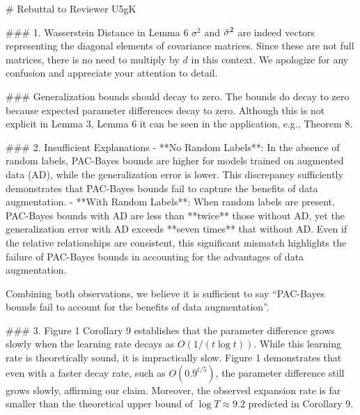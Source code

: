 \documentclass{article}
\begin{document}
\begin{markdown}
# Rebuttal to Reviewer U5gK

### 1. Wasserstein Distance in Lemma 6
$\sigma^2$ and $\Bar{\sigma}^2$ are indeed vectors representing the diagonal elements of covariance matrices. Since these are not full matrices, there is no need to multiply by $d$ in this context. We apologize for any confusion and appreciate your attention to detail.

### Generalization bounds should decay to zero.
The bounds do decay to zero because expected parameter differences decay to zero. Although this is not explicit in Lemma 3, Lemma 6 it can be seen in the application, e.g., Theorem 8.


### 2. Insufficient Explanations
- **No Random Labels**:  
  In the absence of random labels, PAC-Bayes bounds are higher for models trained on augmented data (AD), while the generalization error is lower. This discrepancy sufficiently demonstrates that PAC-Bayes bounds fail to capture the benefits of data augmentation.  
- **With Random Labels**:  
  When random labels are present, PAC-Bayes bounds with AD are less than **twice** those without AD, yet the generalization error with AD exceeds **seven times** that without AD. Even if the relative relationships are consistent, this significant mismatch highlights the failure of PAC-Bayes bounds in accounting for the advantages of data augmentation.
  
Combining both observations, we believe it is sufficient to say ``PAC-Bayes bounds fail to account for the benefits of data augmentation''.

### 3. Figure 1
Corollary 9 establishes that the parameter difference grows slowly when the learning rate decays as $O(1/(t\log t))$. While this learning rate is theoretically sound, it is impractically slow. Figure 1 demonstrates that even with a faster decay rate, such as $O(0.9^{t/5})$, the parameter difference still grows slowly, affirming our claim. Moreover, the observed expansion rate is far smaller than the theoretical upper bound of $\log T \approx 9.2$ predicted in Corollary 9.


\end{markdown}
\end{document}
